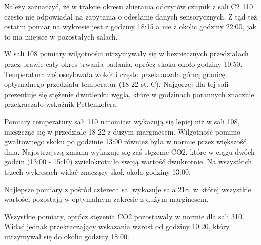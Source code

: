 Należy zaznaczyć, że w trakcie okresu zbierania odczytów czujnik z sali C2 110 często nie odpowiadał na zapytania 
o odesłanie danych sensorycznych. Z tąd też ostatni pomiar na wykresie jest z godziny 18:15 a nie z okolic godziny 
22:00, jak to ma miejsce w pozostałych salach.

W sali 108 pomiary wilgotności utrzymywały się w bezpiecznych przedziałach przez prawie cały
okres trwania badania, oprócz skoku około godziny 10:50. Temperatura zaś oscylowała wokół i często przekraczała
górną granicę optymalnego przedziału temperatur (18-22 st. C). Najgorzej dla tej sali prezentuje się stężenie dwutlenku węgla,
które w godzinach porannych znacznie przekraczało wskaźnik Pettenkofera.

Pomiary temperatury sali 110 natomiast wykazują się lepiej niż w sali 108, mieszcząc się w przedziale 18-22 z dużym
marginesem. Wilgotność pomimo gwałtownego skoku po godzinie 13:00 również była w normie przez większość dnia.
Najostrzejszą zmianą wykazuje się zaś stężenie CO2, które w ciągu dwóch godzin (13:00 - 15:10) zwielokrotniło
swoją wartość dwukrotnie. Na wszystkich trzech wykresach widać znaczący skok około godziny 13:00.

Najlepsze pomiary z pośród czterech sal wykazuje sala 218, w której wszystkie wartości pozostają w optymalnym
zakresie z dużym marginesem.

Wszystkie pomiary, oprócz stężenia CO2 pozostawały w normie dla sali 310. Widać jednak przekraczający wskazania
wzrost od godziny 10:20, który utrzymywał się do okolic godziny 18:00.


